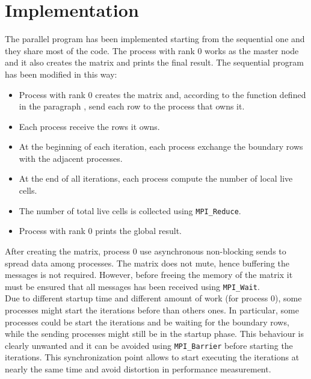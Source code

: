 \documentclass{article}
\begin{document}
\section{Implementation}
The parallel program has been implemented starting from the sequential one and they share most of the code. The process with rank 0 works as the master node and it also creates the matrix and prints the final result. The sequential program has been modified in this way:
\begin{itemize}
    \item Process with rank 0 creates the matrix and, according to the function defined in the paragraph , send each row to the process that owns it.
    \item Each process receive the rows it owns.
    \item At the beginning of each iteration, each process exchange the boundary rows with the adjacent processes.
    \item At the end of all iterations, each process compute the number of local live cells.
    \item The number of total live cells is collected using \texttt{MPI\_Reduce}.
    \item Process with rank 0 prints the global result.
\end{itemize}
After creating the matrix, process 0 use asynchronous non-blocking sends to spread data among processes. The matrix does not mute, hence buffering the messages is not required. However, before freeing the memory of the matrix it must be ensured that all messages has been received using \texttt{MPI\_Wait}. \\
Due to different startup time and different amount of work (for process 0), some processes might start the iterations before than others ones. In particular, some processes could be start the iterations and be waiting for the boundary rows, while the sending processes might still be in the startup phase. This behaviour is clearly unwanted and it can be avoided using \texttt{MPI\_Barrier} before starting the iterations. This synchronization point allows to start executing the iterations at nearly the same time and avoid distortion in performance measurement. \\
\end{document}
